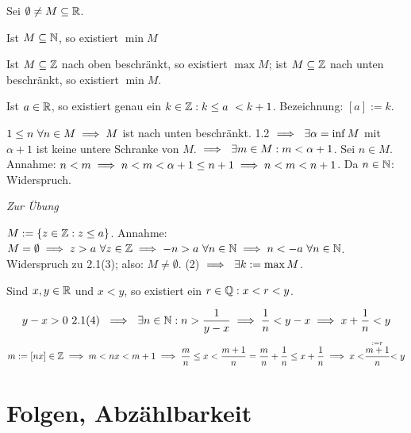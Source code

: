 \documentclass[a4paper,twoside,DIV15,BCOR12mm]{scrbook}
\begin{document}
\begin{satz}
Sei $\emptyset \ne M \subseteq \mathbb{R}$.

\begin{liste}
\item Ist $M \subseteq \mathbb{N}$, so existiert $\min{M}$
\item Ist $M \subseteq \mathbb{Z}$ nach oben beschränkt, so existiert $\max{M}$; ist $M \subseteq \mathbb{Z}$ nach unten beschränkt, so existiert $\min{M}$.
\item Ist $a \in \mathbb{R}$, so existiert genau ein $k \in \mathbb{Z}: k \le a \ < k+1$. Bezeichnung: $[a] := k$.
\end{liste}
\end{satz}

\begin{beweise}
\item $ 1 \le n \ \forall n \in M \implies M $ ist nach unten beschränkt. 1.2 $\folgt \ \exists \alpha = \inf{M}$ mit $\alpha + 1 $ ist keine untere Schranke von $M$. $\implies \ \exists m \in M: m < \alpha + 1$. Sei $n \in M$. Annahme: $n < m \implies n <  m < \alpha +1 \le n +1 \implies n < m < n+1$. Da $n \in \mathbb{N}$: Widerspruch.
\item \textit{Zur Übung}
\item $M := \{ z \in \mathbb{Z}: z \le a \}$. Annahme: $M = \emptyset\folgt z > a \ \forall z \in \MdZ \folgt -n > a \ \forall n \in \MdN \folgt n < -a \ \forall n \in \MdN$. Widerspruch zu 2.1(3); also: $M \ne \emptyset$. (2) $\implies \ \exists k := \max{M}$.
\end{beweise}

\begin{satz}
Sind $x,y \in \mathbb{R}$ und $x<y$, so existiert ein $r \in \mathbb{Q}: x < r < y$.
\end{satz}

\begin{beweis}
$$ y-x > 0 \mbox{ 2.1(4) } \folgt \ \exists n \in \MdN: n > \frac{1}{y-x} \folgt \frac{1}{n} < y-x \folgt x + \frac{1}{n} < y $$
$$ m := [nx] \in \mathbb{Z} \implies m < nx < m+1 \implies \frac{m}{n} \le x < \frac{m+1}{n} = \frac{m}{n} + \frac{1}{n} \le x + \frac{1}{n} \implies x < \stackrel{:= r }{\frac{m+1}{n}} < y$$
\end{beweis}

\chapter{Folgen, Abzählbarkeit}
\end{document}
